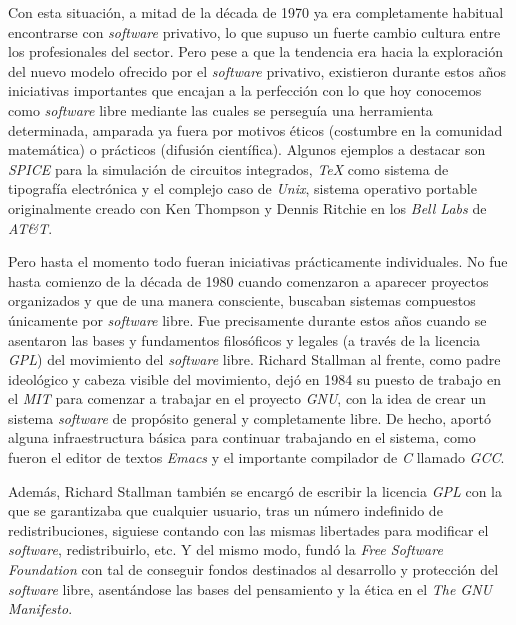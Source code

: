 Con esta situación, a mitad de la década de 1970 ya era completamente habitual
encontrarse con \textit{software} privativo, lo que supuso un fuerte cambio
cultura entre los profesionales del sector. Pero pese a que la tendencia era
hacia la exploración del nuevo modelo ofrecido por el \textit{software}
privativo, existieron durante estos años iniciativas importantes que encajan a
la perfección con lo que hoy conocemos como \textit{software} libre mediante las
cuales se perseguía una herramienta determinada, amparada ya fuera por motivos
éticos (costumbre en la comunidad matemática) o prácticos (difusión científica).
Algunos ejemplos a destacar son \textit{SPICE} para la simulación de circuitos
integrados, \textit{TeX} como sistema de tipografía electrónica y el complejo
caso de \textit{Unix}, sistema operativo portable originalmente creado con Ken
Thompson y Dennis Ritchie en los \textit{Bell Labs} de \textit{AT\&T}.

Pero hasta el momento todo fueran iniciativas prácticamente individuales. No
fue hasta comienzo de la década de 1980 cuando comenzaron a aparecer proyectos
organizados y que de una manera consciente, buscaban sistemas compuestos
únicamente por \textit{software} libre. Fue precisamente durante estos años
cuando se asentaron las bases y fundamentos filosóficos y legales (a través de
la licencia \textit{GPL}) del movimiento del \textit{software} libre. Richard
Stallman al frente, como padre ideológico y cabeza visible del movimiento, dejó
en 1984 su puesto de trabajo en el \textit{MIT} para comenzar a trabajar en el
proyecto \textit{GNU}, con la idea de crear un sistema \textit{software} de
propósito general y completamente libre. De hecho, aportó alguna infraestructura
básica para continuar trabajando en el sistema, como fueron el editor de textos
\textit{Emacs} y el importante compilador de \textit{C} llamado \textit{GCC}.

Además, Richard Stallman también se encargó de escribir la licencia \textit{GPL}
con la que se garantizaba que cualquier usuario, tras un número indefinido de
redistribuciones, siguiese contando con las mismas libertades para modificar el
\textit{software}, redistribuirlo, etc. Y del mismo modo, fundó la \textit{Free
Software Foundation} con tal de conseguir fondos destinados al desarrollo y
protección del \textit{software} libre, asentándose las bases del pensamiento y
la ética en el \textit{The GNU Manifesto}.

